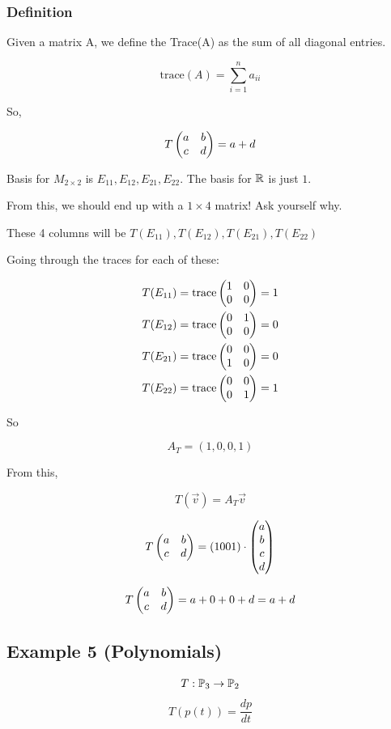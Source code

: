 \documentclass[a4paper]{article}
\begin{document}
\subsubsection{Definition}
Given a matrix A, we define the Trace(A) as the sum of all diagonal entries. 

\[\text{trace}(A) = \sum_{i=1}^{n}a_{ii}\]

So,

\[
	T \genericmat{p}{a&b\\c&d} = a + d
\]

Basis for $M_{2 \times 2}$ is $E_{11}, E_{12}, E_{21}, E_{22}$. The basis for $\R$ is just $1$.

From this, we should end up with a $1 \times 4$ matrix! Ask yourself why.

These 4 columns will be $T(E_{11}),T(E_{12}),T(E_{21}),T(E_{22})$

Going through the traces for each of these:

\[
	\begin{aligned}
		T(E_{11}) &= \text{trace}\genericmat{p}{1 & 0\\0&0} = 1 \\
		T(E_{12}) &= \text{trace}\genericmat{p}{0 & 1\\0&0} = 0 \\
		T(E_{21}) &= \text{trace}\genericmat{p}{0 & 0\\1&0} = 0 \\
		T(E_{22}) &= \text{trace}\genericmat{p}{0 & 0\\0&1} = 1
	\end{aligned}
\]

So 

\[
	A_T = (1,0,0,1)
\]

From this,

\[T(\vec{v}) = A_T \vec{v}\]

\[T \genericmat{p}{a&b\\c&d} = (1 0 0 1) \cdot \genericmat{p}{a\\b\\c\\d}\]

\[T \genericmat{p}{a&b\\c&d} = a + 0 + 0 + d = a + d\]

\subsection{Example 5 (Polynomials)}
\[T: \P_3 \to \P_2\]
\[T(p(t)) = \frac{dp}{dt}\]
\end{document}
